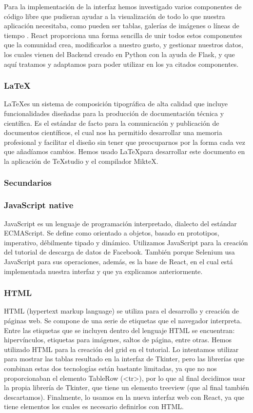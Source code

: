 		Para la implementación de la interfaz hemos investigado varios componentes de código libre que pudieran ayudar a la visualización de todo lo que nuestra aplicación necesitaba, como pueden ser tablas, galerías de imágenes o líneas de tiempo \citep{ReactComp}. React proporciona una forma sencilla de unir todos estos componentes que la comunidad crea, modificarlos a nuestro gusto, y gestionar nuestros datos, los cuales vienen del Backend creado en Python con la ayuda de Flask, y que aquí tratamos y adaptamos para poder utilizar en los ya citados componentes.
	 	
	\subsubsection*{\LaTeX}
		\LaTeX\space es un sistema de composición tipográfica de alta calidad que incluye funcionalidades diseñadas para la producción de documentación técnica y científica. Es el estándar de facto para la comunicación y publicación de documentos científicos, el cual nos ha permitido desarrollar una memoria profesional y facilitar el diseño sin tener que preocuparnos por la forma cada vez que añadíamos cambios.       
		Hemos usado \LaTeX\space para desarrollar este documento en la aplicación de TeXstudio y el compilador MikteX.
		
 	\subsubsection{Secundarios}
 	\subsubsection*{JavaScript native}
		JavaScript es un lenguaje de programación interpretado, dialecto del estándar ECMAScript. Se define como orientado a objetos, basado en prototipos, imperativo, débilmente tipado y dinámico.    
		Utilizamos JavaScript para la creación del tutorial de descarga de datos de Facebook. También porque Selenium usa JavaScript para sus operaciones, además, es la base de React, en el cual está implementada nuestra interfaz y que ya explicamos anteriormente.
		
 	\subsubsection*{HTML}
		HTML (hypertext markup language) se utiliza para el desarrollo y creación de páginas web. Se compone de una serie de etiquetas que el navegador interpreta. Entre las etiquetas que se incluyen dentro del lenguaje HTML se encuentran: hipervínculos, etiquetas para imágenes, saltos de página, entre otras.
		Hemos utilizado HTML para la creación del grid en el tutorial. Lo intentamos utilizar para mostrar las tablas resultado en la interfaz de Tkinter, pero las librerías que combinan estas dos tecnologías están bastante limitadas, ya que no nos proporcionaban el elemento TableRow (<tr>), por lo que al final decidimos usar la propia librería de Tkinter, que tiene un elemento treeview (que al final también descartamos). Finalmente, lo usamos en la nueva interfaz web con React, ya que tiene elementos los cuales es necesario definirlos con HTML.
		
